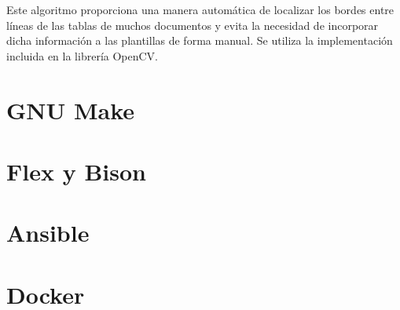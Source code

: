 Este algoritmo proporciona una manera automática de localizar los bordes entre líneas de las tablas de muchos documentos y evita la necesidad de incorporar dicha información a las plantillas de forma manual. Se utiliza la implementación incluida en la librería OpenCV.

\section{GNU Make}
\section{Flex y Bison}
\section{Ansible}
\section{Docker}


